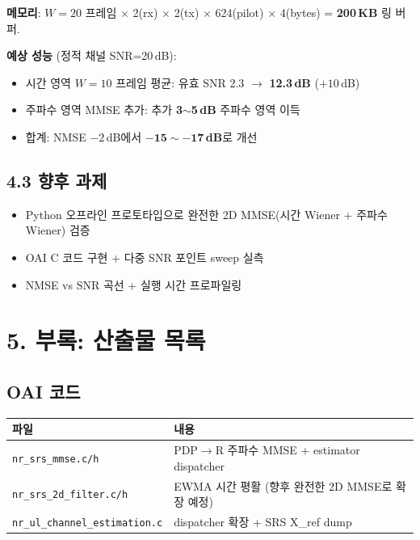 \documentclass[11pt,a4paper]{article}
\begin{document}
\textbf{메모리}: $W=20$ 프레임 $\times$ 2(rx) $\times$ 2(tx) $\times$ 624(pilot) $\times$ 4(bytes) = \textbf{200\,KB} 링 버퍼.

\textbf{예상 성능} (정적 채널 SNR=20\,dB):

\begin{itemize}[leftmargin=2em]
\item 시간 영역 $W=10$ 프레임 평균: 유효 SNR 2.3 $\to$ \textbf{12.3\,dB} ($+10$\,dB)
\item 주파수 영역 MMSE 추가: 추가 \textbf{3$\sim$5\,dB} 주파수 영역 이득
\item 합계: NMSE $-2$\,dB에서 $\mathbf{-15 \sim -17}$\,\textbf{dB}로 개선
\end{itemize}

\subsection{4.3 향후 과제}

\begin{itemize}[leftmargin=2em]
\item Python 오프라인 프로토타입으로 완전한 2D MMSE(시간 Wiener + 주파수 Wiener) 검증
\item OAI C 코드 구현 + 다중 SNR 포인트 sweep 실측
\item NMSE vs SNR 곡선 + 실행 시간 프로파일링
\end{itemize}

\section{5. 부록: 산출물 목록}

\subsection{OAI 코드}

\begin{table}[h]\centering
\begin{tabular}{ll}
\toprule
파일 & 내용 \\
\midrule
\texttt{nr\_srs\_mmse.c/h} & PDP$\to$R 주파수 MMSE + estimator dispatcher \\
\texttt{nr\_srs\_2d\_filter.c/h} & EWMA 시간 평활 (향후 완전한 2D MMSE로 확장 예정) \\
\texttt{nr\_ul\_channel\_estimation.c} & dispatcher 확장 + SRS X\_ref dump \\
\bottomrule
\end{tabular}
\end{table}
\end{document}
